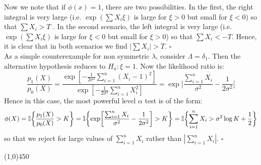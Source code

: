 \documentclass[12pt]{article}
\begin{document}
\noindent
Now we note that if $\phi(x) = 1$, there are two possibilities. In the first, the right integral is very large (i.e. $\exp(\sum X_i \xi)$ is large for $\xi > 0$ but small for $\xi < 0$) so that $\sum X_i > T$ . In the second scenario,  the left integral is very large  (i.e. $\exp(\sum X_i \xi)$ is large for $\xi <0$ but small for $\xi > 0$) so that $\sum X_i < -T$. Hence, it is clear that in both scenarios we find $|\sum X_i| > T$. $\square$\\

\noindent
As a simple counterexample for non symmetric $\lambda$, consider $\Lambda = \delta_1$. Then the alternative hypothesis reduces to $H_a: \xi = 1$. Now the likelihood ratio is:
$$\frac{p_1(X)}{p_0(X)}
= \frac{\exp[-\frac{1}{2\sigma^2}\sum_{i=1}^n(X_i-1)^2]}{\exp[-\frac{1}{2\sigma^2}\sum_{i=1}^nX_i^2]}
= \exp\biggl[\frac{\sum_{i=1}^nX_i}{\sigma^2}-\frac{1}{2\sigma^2}\biggr]$$
Hence in this case, the most powerful level $\alpha$ test is of the form:
$$\phi(X) = \mathbb{I}\biggl\{ \frac{p_1(X)}{p_0(X)} > K\biggr\}
= \mathbb{I}\biggl\{  \exp \biggl[\frac{\sum_{i=1}^nX_i}{\sigma^2}-\frac{1}{2\sigma^2} \biggr] > K \biggr\}
= \mathbb{I} \biggl\{ \sum_{i=1}^nX_i > \sigma^2 \log K + \frac{1}{2} \biggr\}$$
so that we reject for large values of $\sum_{i=1}^n X_i$ rather than $|\sum_{i=1}^n X_i|$. $\square$

\begin{center}
\line(1,0){450}
\end{center}
\end{document}
